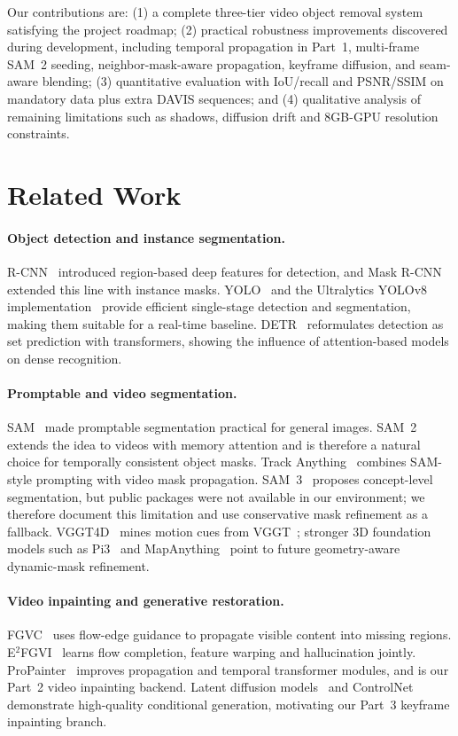\documentclass[10pt,twocolumn,letterpaper]{article}
\begin{document}
Our contributions are: (1) a complete three-tier video object removal system satisfying the project roadmap; (2) practical robustness improvements discovered during development, including temporal propagation in Part~1, multi-frame SAM~2 seeding, neighbor-mask-aware propagation, keyframe diffusion, and seam-aware blending; (3) quantitative evaluation with IoU/recall and PSNR/SSIM on mandatory data plus extra DAVIS sequences; and (4) qualitative analysis of remaining limitations such as shadows, diffusion drift and 8GB-GPU resolution constraints.

\section{Related Work}
\label{sec:related}
\paragraph{Object detection and instance segmentation.}
R-CNN~\cite{rcnn} introduced region-based deep features for detection, and Mask R-CNN~\cite{maskrcnn} extended this line with instance masks. YOLO~\cite{yolo} and the Ultralytics YOLOv8 implementation~\cite{ultralytics} provide efficient single-stage detection and segmentation, making them suitable for a real-time baseline. DETR~\cite{detr} reformulates detection as set prediction with transformers, showing the influence of attention-based models on dense recognition.

\paragraph{Promptable and video segmentation.}
SAM~\cite{sam} made promptable segmentation practical for general images. SAM~2~\cite{sam2} extends the idea to videos with memory attention and is therefore a natural choice for temporally consistent object masks. Track Anything~\cite{track_anything} combines SAM-style prompting with video mask propagation. SAM~3~\cite{sam3} proposes concept-level segmentation, but public packages were not available in our environment; we therefore document this limitation and use conservative mask refinement as a fallback. VGGT4D~\cite{vggt4d} mines motion cues from VGGT~\cite{vggt}; stronger 3D foundation models such as Pi3~\cite{pi3} and MapAnything~\cite{mapanything} point to future geometry-aware dynamic-mask refinement.

\paragraph{Video inpainting and generative restoration.}
FGVC~\cite{fgvc} uses flow-edge guidance to propagate visible content into missing regions. E$^2$FGVI~\cite{e2fgvi} learns flow completion, feature warping and hallucination jointly. ProPainter~\cite{propainter} improves propagation and temporal transformer modules, and is our Part~2 video inpainting backend. Latent diffusion models~\cite{stable_diffusion} and ControlNet~\cite{controlnet} demonstrate high-quality conditional generation, motivating our Part~3 keyframe inpainting branch.
\end{document}
